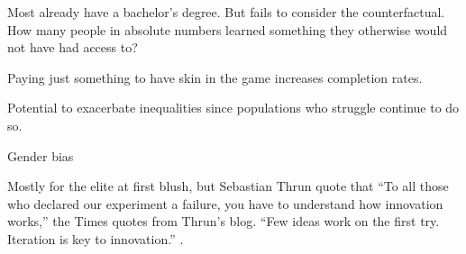 \documentclass[
	letterpaper, %
]{jdf}
\begin{document}

Most already have a bachelor's degree. But fails to consider the counterfactual. How many people in absolute numbers learned something they otherwise would not have had access to? \cite{ho2014harvardx}

Paying just something to have skin in the game increases completion rates. 


Potential to exacerbate inequalities since populations who struggle continue to do so.\cite{solomon2013moocs}


Gender bias \cite{edsurge2014moocs}

Mostly for the elite at first blush, but Sebastian Thrun quote that “To all those who declared our experiment a failure, you have to understand how innovation works,” the Times quotes from Thrun’s blog. “Few ideas work on the first try. Iteration is key to innovation.” \cite{adams2013moocs}.
\end{document}
